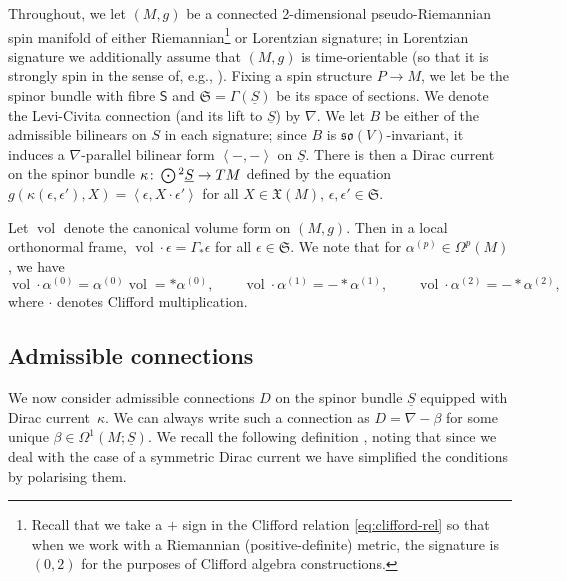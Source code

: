 \documentclass[pdftex]{sigma}
\numberwithin{equation}{section}
\newcommand{\fso}{\mathfrak{so}}
\newcommand{\fX}{\mathfrak{X}}
\newcommand{\fS}{\mathfrak{S}}
\newcommand{\ssS}{\mathsf{S}}
\newcommand{\Sbundle}{\underline{S}}
\newcommand{\Odot}{\mathchoice{{\textstyle\bigodot}}{\bigodot}{\bigodot}{\bigodot}}
\newcommand{\1}{\mathbbm{1}}
\newcommand{\pair}[2]{\left\langle #1,#2\right\rangle} %
\DeclareMathOperator{\Spin}{Spin}
\DeclareMathOperator{\vol}{vol}
\begin{document}
Throughout, we let $(M,g)$ be a connected 2-dimensional pseudo-Riemannian spin manifold of either Riemannian\footnote{Recall that we take a $+$ sign in the Clifford relation \eqref{eq:clifford-rel} so that when we work with a Riemannian (positive-definite) metric, the signature is $(0,2)$ for the purposes of Clifford algebra constructions.} or Lorentzian signature; in Lorentzian signature we additionally assume that $(M,g)$ is time-orientable (so that it is strongly spin in the sense of, e.g., \cite{Cortes2021}). Fixing a spin structure $P\to M$, we let \smash{$\Sbundle:=P\times_{\Spin(V)} \ssS$} be the spinor bundle with fibre $\ssS$ and $\fS=\Gamma(\Sbundle)$ be its space of sections. We denote the Levi-Civita connection (and its lift to $\Sbundle$) by $\nabla$. We let $B$ be either of the admissible bilinears on $S$ in each signature; since $B$ is $\fso(V)$-invariant, it induces a $\nabla$-parallel bilinear form $\pair{-}{-}$ on $\Sbundle$. There is then a Dirac current on the spinor bundle $\kappa\colon\Odot^2 \Sbundle\to TM$ defined by the equation
$
	g(\kappa(\epsilon,\epsilon'),X) = \pair{\epsilon}{X\cdot \epsilon'}
$
for all $X\in\fX(M)$, $\epsilon,\epsilon'\in\fS$.

Let $\vol$ denote the canonical volume form on $(M,g)$. Then in a local orthonormal frame, $\vol\cdot\epsilon=\Gamma_*\epsilon$ for all $\epsilon\in\fS$. We note that for $\alpha^{(p)}\in\Omega^p(M)$, we have
\[
	\vol\cdot \alpha^{(0)} = \alpha^{(0)}\vol = *\alpha^{(0)},
	\qquad \vol\cdot\alpha^{(1)} = -*\alpha^{(1)},
	\qquad \vol\cdot\alpha^{(2)} = -*\alpha^{(2)},
\]
where $\cdot$ denotes Clifford multiplication.

\subsection{Admissible connections}

We now consider admissible connections $D$ on the spinor bundle $\Sbundle$ equipped with Dirac current~$\kappa$. We can always write such a connection as $D=\nabla-\beta$ for some unique $\beta\in\Omega^1(M;\Sbundle)$. We recall the following definition \cite[Definition~3.6]{Beckett2024_2}, noting that since we deal with the case of a symmetric Dirac current we have simplified the conditions by polarising them.
\end{document}
